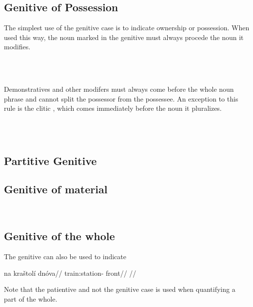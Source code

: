 \subsection{Genitive of Possession}

The simplest use of the genitive case is to indicate ownership or possession.
When used this way, the noun marked in the genitive must always procede the noun
it modifies.


\pex
{}\\
\\
\xe

Demonstratives and other modifers must always come before
the whole noun phrase and cannot split the possessor from the possessee. An
exception to this rule is the clitic , which comes immediately before
the noun it pluralizes.

\pex
\a  {}\\
\a  {}\\
\xe

\subsection{Partitive Genitive}

\subsection{Genitive of material}

\ex
{}\\
\irdp{}{}
\xe

\subsection{Genitive of the whole}
The genitive can also be used to indicate

\pex
\begingl
\gla na kra\v{s}tol\'i dn\'ova//
\glb {} train:station- front//
\glft {}//
\endgl
\xe

Note that the patientive and not the genitive case is used when quantifying a part of the whole.

